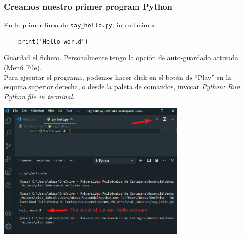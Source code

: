 \documentclass[9pt]{beamer}
\begin{document}
\begin{frame}[fragile]
  \frametitle{Creamos nuestro primer program Python}
  En la primer línea de {\tt say\_hello.py}, introducimos
  \begin{lstlisting}
    print('Hello world')
  \end{lstlisting}\vspace{-0.5cm}
  Guardad el fichero. Personalmente tengo la opción de auto-guardado
  activada (Menú File).\\ \smallskip
  \pause
  Para ejecutar el programa, podemos hacer click en el botón de
  ``Play'' en la esquina superior derecha, o desde la paleta de
  comandos, invocar \textit{Python: Run Python file in terminal}.
  \begin{center}
    \includegraphics[width=0.7\textwidth]{run_file}
  \end{center}
\end{frame}
\end{document}
